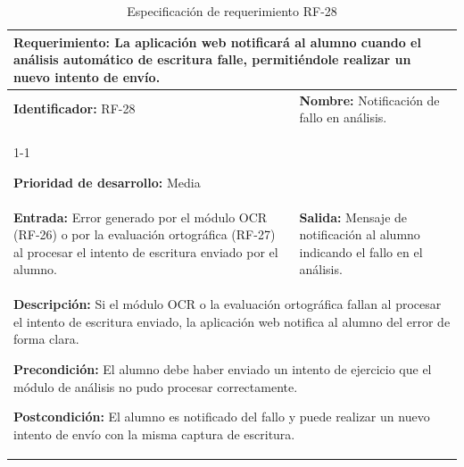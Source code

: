 \begin{longtable}{|p{7cm}|p{8cm}|}
\caption{Especificación de requerimiento RF-28}
\label{tab:rf28} \\ \hline

\multicolumn{2}{|p{15cm}|}{\textbf{Requerimiento:} La aplicación web notificará al alumno cuando el análisis automático de escritura falle, permitiéndole realizar un nuevo intento de envío.} \\ \hline

\textbf{Identificador:} RF-28 &
\textbf{Nombre:} Notificación de fallo en análisis. \\ \cline{1-1}

\textbf{Prioridad de desarrollo:} Media &
\multicolumn{1}{p{8cm}|}{} \\ \hline

\textbf{Entrada:} Error generado por el módulo OCR (RF-26) o por la evaluación ortográfica (RF-27) al procesar el intento de escritura enviado por el alumno. &
\textbf{Salida:} Mensaje de notificación al alumno indicando el fallo en el análisis. \\ \hline

\multicolumn{2}{|p{15cm}|}{
\textbf{Descripción:} Si el módulo OCR o la evaluación ortográfica fallan al procesar el intento de escritura enviado, la aplicación web notifica al alumno del error de forma clara.

\vspace{0.2cm}
\textbf{Precondición:} El alumno debe haber enviado un intento de ejercicio que el módulo de análisis no pudo procesar correctamente.

\vspace{0.2cm}
\textbf{Postcondición:} El alumno es notificado del fallo y puede realizar un nuevo intento de envío con la misma captura de escritura.
} \\ \hline

\end{longtable}

